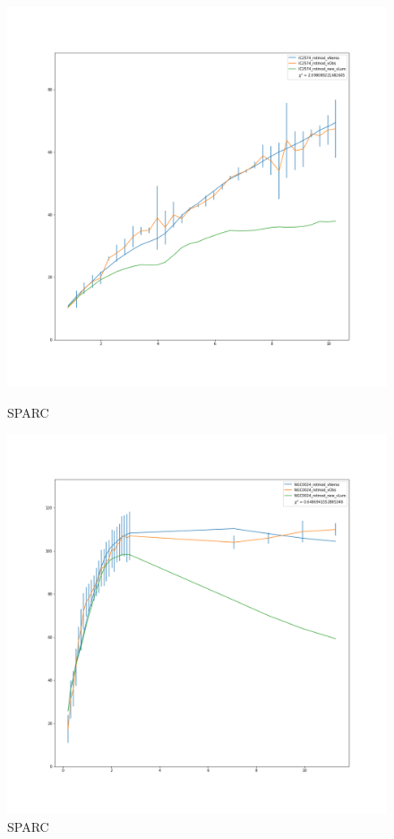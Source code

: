\documentclass[reprint,%
 amsmath,amssymb,
 aps,
]{revtex4-1}
\begin{document}
 
\begin{figure} 
\centering
\begin{minipage}{0.5\textwidth}
  \includegraphics[width=.8\linewidth]{figures/IC2574_rotmod_XueSofue.png}
\caption{ SPARC\cite{2016Lelli}}
\label{fig:2841}
\end{minipage}
\begin{minipage}{0.5\textwidth}
  \includegraphics[width=.8\linewidth]{figures/NGC0024_rotmod_XueSofue.png}
\caption{ SPARC\cite{2016Lelli}}
\label{fig:2915}
\end{minipage}
\end{figure}
\end{document}
